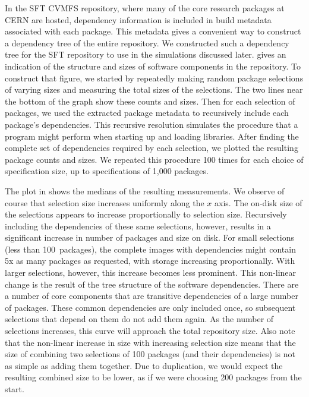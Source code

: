 \documentclass[sigconf]{acmart}
\begin{document}
In the SFT CVMFS repository, where many of the core research packages at CERN are hosted,
dependency information is included in build metadata associated with each package.
This metadata gives a convenient way to construct a dependency
tree of the entire repository.
We constructed such a dependency tree for the SFT repository to use in the simulations discussed later.
 gives an indication of the structure and sizes of software components in the repository.
To construct that figure,
we started by repeatedly making random package selections of varying sizes and measuring the total sizes of the selections.
The two lines near the bottom of the graph show these counts and sizes.
Then for each selection of packages,
we used the extracted package metadata to recursively include each package's dependencies.
This recursive resolution simulates the procedure that a program might perform when starting up and loading libraries.
After finding the complete set of dependencies required by each selection,
we plotted the resulting package counts and sizes.
We repeated this procedure 100 times for each choice of specification size,
up to specifications of 1,000 packages.

The plot in  shows the medians of the resulting measurements.
We observe of course that selection size increases uniformly along the $x$ axis.
The on-disk size of the selections appears to increase proportionally to selection size.
Recursively including the dependencies of these same selections,
however, results in a significant increase in number of packages and size on disk.
For small selections (less than 100~packages),
the complete images with dependencies might contain 5x as many packages as requested,
with storage increasing proportionally.
With larger selections, however,
this increase becomes less prominent.
This non-linear change is the result of the tree structure of the software dependencies.
There are a number of core components that are transitive dependencies of a large number of packages.
These common dependencies are only included once,
so subsequent selections that depend on them do not add them again.
As the number of selections increases,
this curve will approach the total repository size.
Also note that the non-linear increase in size with increasing selection size means that the size of combining two selections of 100 packages (and their dependencies) is not as simple as adding them together.
Due to duplication, we would expect the resulting combined size to be lower,
as if we were choosing 200 packages from the start.
\end{document}

